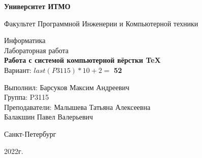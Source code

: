 \thispagestyle{empty}
\begin{center}
    \textbf{Университет ИТМО}

    \vspace{1em}
    Факультет Программной Инженерии и Компьютерной техники

    \vspace{20em}
    
    {\Large Информатика}\\[1em]
    {\Large Лабораторная работа }\\[1em]
    {\Large \textbf{Работа с системой компьютерной вёрстки \TeX}}\\[1em]
    Вариант: $last(P3115) * 10 + 2 =$ \textbf{52}
\end{center}

\vspace{12em}

\begin{flushright}
    Выполнил:
    Барсуков Максим Андреевич\\
    Группа: P3115\\
    Преподаватели:
    Малышева Татьяна Алексеевна\\
    Балакшин Павел Валерьевич \\
\end{flushright}
\vspace{8em}
\vspace{\fill}

\begin{center}
Санкт-Петербург

2022г.
\end{center}